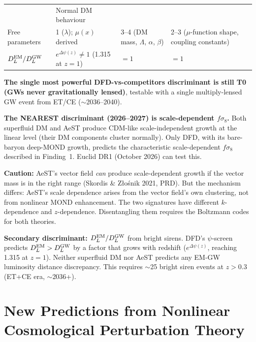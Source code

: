 \documentclass[11pt]{article}
\begin{document}
\begin{tcolorbox}[colback=blue!5!white, colframe=blue!70!black,
  title=\textbf{TOP 5 FINDINGS (Ranked by Impact on DFD Programme)}]
\begin{enumerate}
\begin{table}[h]
\begin{tabular}{p{3.2cm}p{3.5cm}p{3.5cm}p{3.5cm}}
    & Normal DM behaviour \\[3pt]
  Free parameters
    & 1 ($\lambda$); $\mu(x)$ derived
    & 3--4 (DM mass, $\Lambda$, $\alpha$, $\beta$)
    & 2--3 ($\mu$-function shape, coupling constants) \\[3pt]
  $D_L^{\rm EM}/D_L^{\rm GW}$
    & $e^{\Delta\psi(z)} \neq 1$ (1.315 at $z=1$)
    & $= 1$
    & $= 1$ \\
  \bottomrule
  \end{tabular}
  \end{table}

  \textbf{The single most powerful DFD-vs-competitors discriminant is
  still T0 (GWs never gravitationally lensed)}, testable with a single
  multiply-lensed GW event from ET/CE ($\sim$2036--2040).

  \textbf{The NEAREST discriminant (2026--2027) is scale-dependent
  $f\sigma_8$.}  Both superfluid DM and AeST produce CDM-like
  scale-independent growth at the linear level (their DM components
  cluster normally).  Only DFD, with its bare-baryon deep-MOND growth,
  predicts the characteristic scale-dependent $f\sigma_8$ described in
  Finding~1.  Euclid DR1 (October 2026) can test this.

  \textbf{Caution:}  AeST's vector field \emph{can} produce
  scale-dependent growth if the vector mass is in the right range
  (Skordis \& Z\l{}o\'snik 2021, PRD).  But the mechanism differs:
  AeST's scale dependence arises from the vector field's own
  clustering, not from nonlinear MOND enhancement.  The two signatures
  have different $k$-dependence and $z$-dependence.  Disentangling
  them requires the Boltzmann codes for both theories.

  \textbf{Secondary discriminant: $D_L^{\rm EM}/D_L^{\rm GW}$} from
  bright sirens.  DFD's $\psi$-screen predicts $D_L^{\rm EM} > D_L^{\rm GW}$
  by a factor that grows with redshift ($e^{\Delta\psi(z)}$, reaching
  1.315 at $z = 1$).  Neither superfluid DM nor AeST predicts any
  EM-GW luminosity distance discrepancy.  This requires $\sim$25
  bright siren events at $z > 0.3$ (ET+CE era, $\sim$2036+).

\end{enumerate}
\end{tcolorbox}


\section{New Predictions from Nonlinear Cosmological Perturbation Theory}
\label{sec:new-predictions}
\end{document}

